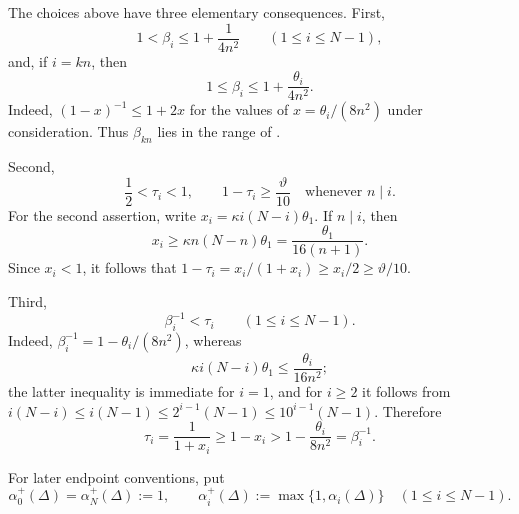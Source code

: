 \documentclass[reqno,11pt]{amsart}
\numberwithin{equation}{section}
\theoremstyle{definition}
\theoremstyle{remark}
\begin{document}
The choices above have three elementary consequences. First,
\begin{equation}\label{eq:beta-local-range}
1<\beta_i\le 1+\frac{1}{4n^2}
\qquad (1\le i\le N-1),
\end{equation}
and, if $i=kn$, then
\begin{equation}\label{eq:beta-critical-range}
1\le\beta_i\le 1+\frac{\theta_i}{4n^2}.
\end{equation}
Indeed, $(1-x)^{-1}\le1+2x$ for the values of
$x=\theta_i/(8n^2)$ under consideration. Thus $\beta_{kn}$ lies in
the range of .

Second,
\begin{equation}\label{eq:tau-range}
\frac12<\tau_i<1,
\qquad
1-\tau_i\ge \frac{\vartheta}{10}
\quad\text{whenever }n\mid i.
\end{equation}
For the second assertion, write
$x_i=\kappa i(N-i)\theta_1$. If $n\mid i$, then
$$
x_i\ge \kappa n(N-n)\theta_1
=\frac{\theta_1}{16(n+1)}.
$$
Since $x_i<1$, it follows that
$1-\tau_i=x_i/(1+x_i)\ge x_i/2\ge\vartheta/10$.

Third,
\begin{equation}\label{eq:beta-tau-comparison}
\beta_i^{-1}<\tau_i
\qquad (1\le i\le N-1).
\end{equation}
Indeed, $\beta_i^{-1}=1-\theta_i/(8n^2)$, whereas
$$
\kappa i(N-i)\theta_1
\le \frac{\theta_i}{16n^2};
$$
the latter inequality is immediate for $i=1$, and for $i\ge2$ it
follows from $i(N-i)\le i(N-1)\le 2^{i-1}(N-1)\le10^{i-1}(N-1)$.
Therefore
$$
\tau_i=\frac1{1+x_i}\ge1-x_i
>1-\frac{\theta_i}{8n^2}=\beta_i^{-1}.
$$

For later endpoint conventions, put
$$
\alpha_0^+(\Delta)=\alpha_N^+(\Delta):=1,
\qquad
\alpha_i^+(\Delta):=\max\{1,\alpha_i(\Delta)\}
\quad (1\le i\le N-1).
$$
\end{document}
